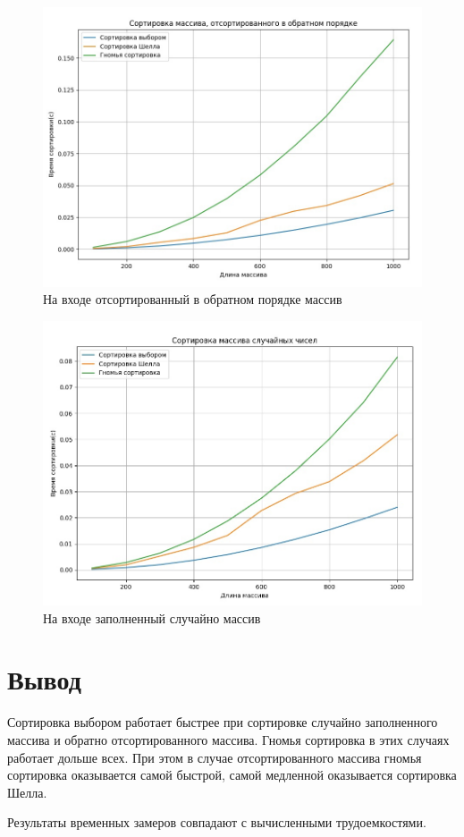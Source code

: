 \begin{figure}[H]
	\begin{center}
		\includegraphics[scale=0.4]{img/worst-type.jpg}
	\end{center}
	\captionsetup{justification=centering}
	\caption{На входе отсортированный в обратном порядке массив}
	\label{img:worst-type}
\end{figure}

\begin{figure}[H]
	\begin{center}
		\includegraphics[scale=0.4]{img/random-type.jpg}
	\end{center}
	\captionsetup{justification=centering}
	\caption{На входе заполненный случайно массив}
	\label{img:random-type}
\end{figure}

\section*{Вывод}

Сортировка выбором работает быстрее при сортировке случайно заполненного массива и обратно отсортированного массива. Гномья сортировка в этих случаях работает дольше всех. При этом в случае отсортированного массива гномья сортировка оказывается самой быстрой, самой медленной оказывается сортировка Шелла.

Результаты временных замеров совпадают с вычисленными трудоемкостями.